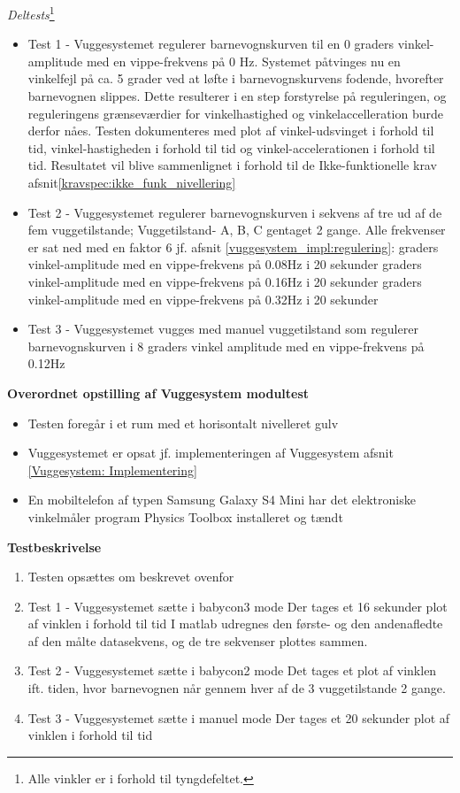 \textit{Deltests}\footnote{Alle vinkler er i forhold til tyngdefeltet.}
\begin{itemize}
	\item Test 1 - Vuggesystemet regulerer barnevognskurven til en 0 graders vinkel-amplitude med en vippe-frekvens på 0 Hz. Systemet påtvinges nu en vinkelfejl på ca. 5 grader ved at løfte i barnevognskurvens fodende, hvorefter barnevognen slippes. Dette resulterer i en step forstyrelse på reguleringen, og reguleringens grænseværdier for vinkelhastighed og vinkelaccelleration   burde derfor nåes. Testen dokumenteres med plot af vinkel-udsvinget i forhold til tid, vinkel-hastigheden i forhold til tid og vinkel-accelerationen i forhold til tid. Resultatet vil blive sammenlignet i forhold til de Ikke-funktionelle krav afsnit\vref{kravspec:ikke_funk_nivellering}
	\item Test 2 - Vuggesystemet regulerer barnevognskurven i sekvens af tre ud af de fem vuggetilstande; Vuggetilstand- A, B, C gentaget 2 gange. Alle frekvenser er sat ned med en faktor 6 jf. afsnit \vref{vuggesystem_impl:regulering}: 
		 graders vinkel-amplitude med en vippe-frekvens på 0.08Hz i 20 sekunder 
		 graders vinkel-amplitude med en vippe-frekvens på 0.16Hz i 20 sekunder  
		 graders vinkel-amplitude med en vippe-frekvens på 0.32Hz i 20 sekunder 
	\item Test 3 - Vuggesystemet vugges med manuel vuggetilstand som regulerer barnevognskurven i 8 graders vinkel amplitude med en vippe-frekvens på 0.12Hz
\end{itemize}



\textbf{Overordnet opstilling af Vuggesystem modultest}

\begin{itemize}
	\item Testen foregår i et rum med et horisontalt nivelleret gulv
	\item Vuggesystemet er opsat jf. implementeringen af Vuggesystem afsnit \vref{Vuggesystem: Implementering}
	\item En mobiltelefon af typen Samsung Galaxy S4 Mini \citep{website:Samsung} har det elektroniske vinkelmåler program Physics Toolbox \citep{website:physicstoolbox} installeret og tændt
\end{itemize}


\textbf{Testbeskrivelse}
\begin{enumerate}
	\item Testen opsættes om beskrevet ovenfor
	\item Test 1 - Vuggesystemet sætte i babycon3 mode
	\subitem Der tages et 16 sekunder plot af vinklen i forhold til tid
	\subitem I matlab udregnes den første- og den andenafledte af den målte datasekvens, og de tre sekvenser plottes sammen.
	\item Test 2 - Vuggesystemet sætte i babycon2 mode
	\subitem Det tages et plot af vinklen ift. tiden, hvor barnevognen når gennem hver af de 3 vuggetilstande 2 gange.
	\item Test 3 - Vuggesystemet sætte i manuel mode
	\subitem Der tages et 20 sekunder plot af vinklen i forhold til tid
\end{enumerate}


